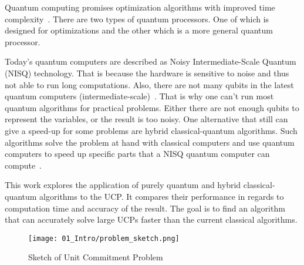 Quantum computing promises optimization algorithms with improved time complexity~\cite{Portnov2000, Ahuja1999, Gilliam2019, Ajagekar2020, Shaydulin2019}.
There are two types of quantum processors.
One of which is designed for optimizations and the other which is a more general quantum processor.

Today's quantum computers are described as Noisy Intermediate-Scale Quantum (NISQ) technology.
That is because the hardware is sensitive to noise and thus not able to run long computations.
Also, there are not many qubits in the latest quantum computers (intermediate-scale)~\cite{Leymann2020}.
That is why one can't run most quantum algorithms for practical problems.
Either there are not enough qubits to represent the variables, or the result is too noisy.
One alternative that still can give a speed-up for some problems are hybrid classical-quantum algorithms.
Such algorithms solve the problem at hand with classical computers and use quantum computers to speed up specific parts that a NISQ quantum computer can compute~\cite{Ajagekar2020, Shaydulin2019}.

This work explores the application of purely quantum and hybrid classical-quantum algorithms to the UCP.
It compares their performance in regards to computation time and accuracy of the result.
The goal is to find an algorithm that can accurately solve large UCPs faster than the current classical algorithms.

\begin{figure}[!ht]
  \centering
  \texttt{[image: 01\_Intro/problem\_sketch.png]}
  \caption{Sketch of Unit Commitment Problem}
  \label{figure:problem.sketch}
\end{figure}
